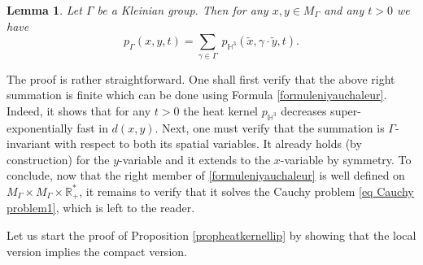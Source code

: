 \documentclass[10pt]{amsart}
\theoremstyle{plain}
\newtheorem{lemma}[equation]{Lemma}
\theoremstyle{definition}
\newcommand{\HH}{\mathbb{H}}
\newcommand{\RR}{\mathbb{R}}
\newcommand{\somme}[1]{\sum_{#1}}
\begin{document}
\begin{lemma}
\label{lemheatkernelseries}
Let $\Gamma$ be a Kleinian group. Then for any $x, y \in M_{\Gamma}$ and any $t > 0$ we have
\[
p_{\Gamma}(x,y,t) = \somme{\gamma \in \Gamma} \ p_{\HH^3}(\tilde{x},\gamma \cdot \tilde{y},t).
\]
\end{lemma}

The proof is rather straightforward. One shall first verify that the above right summation is finite which can be done using Formula \ref{formuleniyauchaleur}. Indeed, it shows that for any $t > 0$ the heat kernel $p_{\HH^3}$ decreases super-exponentially fast in $d(x,y)$. Next, one must verify that the summation is $\Gamma$-invariant with respect to both its spatial variables. It already holds (by construction) for the $y$-variable and it extends to the $x$-variable by symmetry. To conclude, now that the right member of \eqref{formuleniyauchaleur} is well defined on $M_{\Gamma} \times M_{\Gamma} \times \RR_+^*$, it remains to verify that it solves the Cauchy problem \eqref{eq Cauchy problem1}, which is left to the reader.

Let us start the proof of Proposition \ref{propheatkernellip} by showing that the local version implies the compact version.
\end{document}
